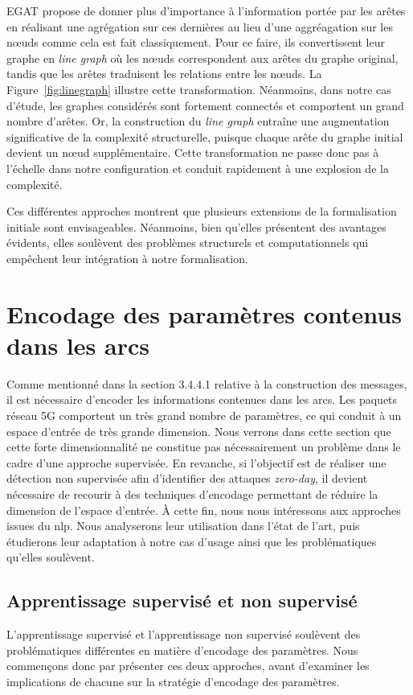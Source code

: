 \documentclass[a4paper,11pt,twoside]{StyleThese}
\begin{document}
EGAT \cite{egat} propose de donner plus d'importance à l’information portée par les arêtes en réalisant une agrégation sur ces dernières au lieu d'une aggréagation sur les nœuds comme cela est fait classiquement. Pour ce faire, ils convertissent leur graphe en \textit{line graph} où les nœuds correspondent aux arêtes du graphe original, tandis que les arêtes traduisent les relations entre les nœuds. La Figure~\ref{fig:linegraph} illustre cette transformation. Néanmoins, dans notre cas d’étude, les graphes considérés sont fortement connectés et comportent un grand nombre d’arêtes. Or, la construction du \textit{line graph} entraîne une augmentation significative de la complexité structurelle, puisque chaque arête du graphe initial devient un nœud supplémentaire. Cette transformation ne passe donc pas à l’échelle dans notre configuration et conduit rapidement à une explosion de la complexité.

Ces différentes approches montrent que plusieurs extensions de la formalisation initiale sont envisageables. Néanmoins, bien qu’elles présentent des avantages évidents, elles soulèvent des problèmes structurels et computationnels qui empêchent leur intégration à notre formalisation.

\section{Encodage des paramètres contenus dans les arcs} %
Comme mentionné dans la section 3.4.4.1 relative à la construction des messages, il est nécessaire d’encoder les informations contenues dans les arcs. Les paquets réseau 5G comportent un très grand nombre de paramètres, ce qui conduit à un espace d’entrée de très grande dimension. Nous verrons dans cette section que cette forte dimensionnalité ne constitue pas nécessairement un problème dans le cadre d’une approche supervisée. En revanche, si l’objectif est de réaliser une détection non supervisée afin d’identifier des attaques \textit{zero-day}, il devient nécessaire de recourir à des techniques d’encodage permettant de réduire la dimension de l’espace d’entrée. À cette fin, nous nous intéressons aux approches issues du \gls{nlp}. Nous analyserons leur utilisation dans l’état de l’art, puis étudierons leur adaptation à notre cas d’usage ainsi que les problématiques qu’elles soulèvent.

\subsection{Apprentissage supervisé et non supervisé}
L’apprentissage supervisé et l’apprentissage non supervisé soulèvent des problématiques différentes en matière d’encodage des paramètres. Nous commençons donc par présenter ces deux approches, avant d’examiner les implications de chacune sur la stratégie d’encodage des paramètres.
\end{document}
